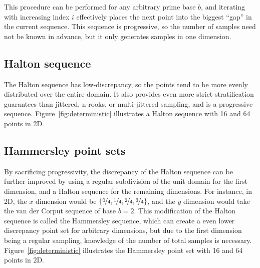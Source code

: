 \documentclass[11pt,fleqn]{book} %
\begin{document}
This procedure can be performed for any arbitrary prime base $b$, and iterating with increasing index $i$ effectively places the next point into the biggest ``gap'' in the current sequence. This sequence is progressive, so the number of samples need not be known in advance, but it only generates samples in one dimension.



\subsection{Halton sequence}
The Halton sequence has low-discrepancy, so the points tend to be more evenly distributed over the entire domain. It also provides even more strict stratification guarantees than jittered, n-rooks, or multi-jittered sampling, and is a progressive sequence. Figure~\ref{fig:deterministic} illustrates a Halton sequence with 16 and 64 points in 2D.

\subsection{Hammersley point sets}
By sacrificing progressivity, the discrepancy of the Halton sequence can be further improved by using a regular subdivision of the unit domain for the first dimension, and a Halton sequence for the remaining dimensions. For instance, in 2D, the $x$ dimension would be $\left\{\nicefrac{0}{4}, \nicefrac{1}{4}, \nicefrac{2}{4}, \nicefrac{3}{4}\right\}$, and the $y$ dimension would take the van der Corput sequence of base $b=2$. This modification of the Halton sequence is called the Hammersley sequence, which can create a even lower discrepancy point set for arbitrary dimensions, but due to the first dimension being a regular sampling, knowledge of the number of total samples is necessary. Figure~\ref{fig:deterministic} illustrates the Hammersley point set with 16 and 64 points in 2D.
%
%

%
\end{document}
